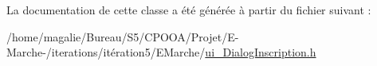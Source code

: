 La documentation de cette classe a été générée à partir du fichier suivant \-:\begin{DoxyCompactItemize}
\item 
/home/magalie/\-Bureau/\-S5/\-C\-P\-O\-O\-A/\-Projet/\-E-\/\-Marche-\//iterations/itération5/\-E\-Marche/\hyperlink{ui___dialog_inscription_8h}{ui\-\_\-\-Dialog\-Inscription.\-h}\end{DoxyCompactItemize}
